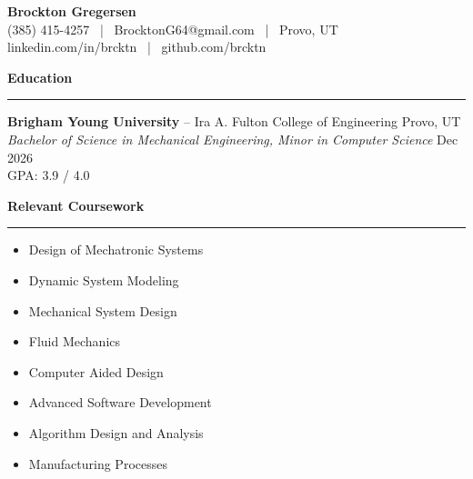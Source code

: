 \documentclass[a4paper,10pt]{article}
\newcommand{\sectionline}{\noindent\rule{\linewidth}{0.5pt}\vspace{-0.5em}}
\begin{document}
\begin{center}
    {\huge \textbf{Brockton Gregersen}} \\
    (385) 415-4257 \ | \ BrocktonG64@gmail.com \ | \ Provo, UT \\
    linkedin.com/in/brcktn \ | \ github.com/brcktn
\end{center}

\textbf{Education} \vspace{-1em}\\
\sectionline

\textbf{Brigham Young University} -- Ira A. Fulton College of Engineering \hfill Provo, UT \\
\emph{Bachelor of Science in Mechanical Engineering, Minor in Computer Science} \hfill Dec 2026 \\
GPA: 3.9 / 4.0

\textbf{Relevant Coursework} \vspace{-1em}\\
\sectionline
\vspace{-0.5em}
\begin{multicols}{2}
    \begin{itemize}[noitemsep, topsep=0pt]
        \item Design of Mechatronic Systems
        \item Dynamic System Modeling
        \item Mechanical System Design
        \item Fluid Mechanics
    \end{itemize}

    \columnbreak

    \begin{itemize}[noitemsep, topsep=0pt]
        \item Computer Aided Design
        \item Advanced Software Development
        \item Algorithm Design and Analysis
        \item Manufacturing Processes
    \end{itemize}
\end{multicols}
\vspace{-1em}
\end{document}
